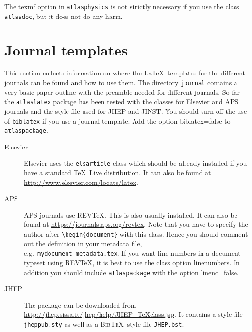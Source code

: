 \documentclass[UKenglish]{latex/atlasdoc}
\newcommand{\BibTeX}{\textsc{Bib\TeX}}
\newcommand{\File}[1]{\texttt{#1}\xspace}
\newcommand{\Option}[1]{\textsf{#1}\xspace}
\newcommand{\Package}[1]{\texttt{#1}\xspace}
\begin{document}
The \Option{texmf} option in \Package{atlasphysics} is not strictly necessary if you use the class \Package{atlasdoc},
but it does not do any harm.


\section{Journal templates}
\label{sec:journal}

This section collects information on where the \LaTeX\ templates for the different journals can be found and how to use them.
The directory \File{journal} contains a very basic paper outline with the preamble needed for different journals.
So far the \Package{atlaslatex} package has been tested with the classes for Elsevier and APS journals and the style file used for JHEP and JINST.
You should turn off the use of \Package{biblatex} if you use a journal template.
Add the option \Option{biblatex=false} to \Package{atlaspackage}.

\begin{description}
\item[Elsevier]Elsevier uses the \texttt{elsarticle} class which should be already installed if you have a standard 
  \TeX\ Live distribution. 
  It can also be found at \url{http://www.elsevier.com/locate/latex}.
  
\item[APS]APS journals use REV\TeX. This is also usually installed.
  It can also be found at \url{https://journals.aps.org/revtex}.
  Note that you have to specify the author after \verb|\begin{document}| with this class.
  Hence you should comment out the definition in your metadata file,\\
  e.g.\ \File{mydocument-metadata.tex}.
  If you want line numbers in a document typeset using REV\TeX, it is best to use the class option \Option{linenumbers}.
  In addition you should include \Package{atlaspackage} with the option \Option{lineno=false}.
  
\item[JHEP]The package can be downloaded from \url{http://jhep.sissa.it/jhep/help/JHEP_TeXclass.jsp}. It contains a style file \File{jheppub.sty} as well as a \BibTeX\ style file \File{JHEP.bst}. 
\end{description}


\end{document}
